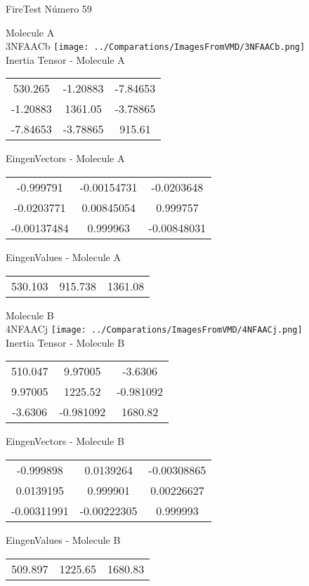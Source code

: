 \vtab[-2cm]
\begin{center}
{\large FireTest \tab Número 59}
\end{center}
\begin{multicols}{2}
\begin{center}

Molecule A \\ 
3NFAACb
\texttt{[image: ../Comparations/ImagesFromVMD/3NFAACb.png]}
\\
Inertia Tensor - Molecule A \\
\vtab

\begin{tabular}{|c c c|}
530.265	 & 	-1.20883	 & 	-7.84653	 \\
-1.20883	 & 	1361.05	 & 	-3.78865	 \\
-7.84653	 & 	-3.78865	 & 	915.61
\end{tabular}

\vtab
 EingenVectors - Molecule A     \\
\vtab
\begin{tabular}{|c c c|}
-0.999791	 & 	-0.00154731	 & 	-0.0203648	 \\
-0.0203771	 & 	0.00845054	 & 	0.999757	 \\
-0.00137484	 & 	0.999963	 & 	-0.00848031
\end{tabular}

\vtab
 EingenValues - Molecule A     \\
\vtab
\begin{tabular}{|c c c|}
530.103	 & 	915.738	 & 	1361.08	 \\
\end{tabular}
\columnbreak

Molecule B \\ 
4NFAACj
\texttt{[image: ../Comparations/ImagesFromVMD/4NFAACj.png]}
\\
Inertia Tensor - Molecule B \\
\vtab

\begin{tabular}{|c c c|}
510.047	 & 	9.97005	 & 	-3.6306	 \\
9.97005	 & 	1225.52	 & 	-0.981092	 \\
-3.6306	 & 	-0.981092	 & 	1680.82
\end{tabular}

\vtab
 EingenVectors - Molecule B     \\
\vtab
\begin{tabular}{|c c c|}
-0.999898	 & 	0.0139264	 & 	-0.00308865	 \\
0.0139195	 & 	0.999901	 & 	0.00226627	 \\
-0.00311991	 & 	-0.00222305	 & 	0.999993
\end{tabular}

\vtab
 EingenValues - Molecule B     \\
\vtab
\begin{tabular}{|c c c|}
509.897	 & 	1225.65	 & 	1680.83	 \\
\end{tabular}

\end{center}
\end{multicols}
